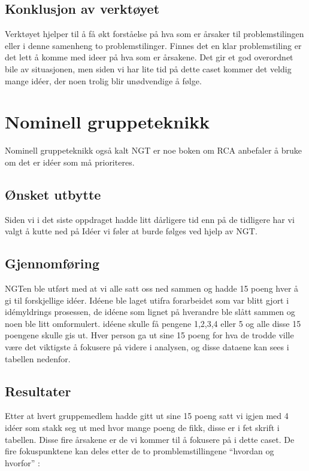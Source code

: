 \subsection{Konklusjon av verktøyet}
Verktøyet hjelper til å få økt forståelse på hva som er årsaker til problemstilingen eller i denne samenheng to problemstilinger. Finnes det en klar problemstiling er det lett å komme med ideer på hva som er årsakene. Det gir et god overordnet bile av situasjonen, men siden vi har lite tid på dette caset kommer det veldig mange idéer, der noen trolig blir unødvendige å følge.



\section{Nominell gruppeteknikk}
Nominell gruppeteknikk også kalt NGT er noe boken om RCA \cite{RCA} anbefaler å bruke om det er idéer som må prioriteres. 

\subsection{Ønsket utbytte}
Siden vi i det siste oppdraget hadde litt dårligere tid enn på de tidligere har vi valgt å kutte ned på Idéer vi føler at burde følges ved hjelp av NGT.
\subsection{Gjennomføring}
NGTen ble utført med at vi alle satt oss ned sammen og hadde 15 poeng hver å gi til forskjellige idéer. Idéene ble laget utifra forarbeidet som var blitt gjort i idémyldrings prosessen, de idéene som lignet på hverandre ble slått sammen og noen ble litt omformulert. idéene skulle få pengene 1,2,3,4 eller 5 og alle disse 15 poengene skulle gis ut. Hver person ga ut sine 15 poeng for hva de trodde ville være det viktigste å fokusere på videre i analysen, og disse dataene kan sees i tabellen nedenfor.

\subsection{Resultater}
Etter at hvert gruppemedlem hadde gitt ut sine 15 poeng satt vi igjen med 4 idéer som stakk seg ut med hvor mange poeng de fikk, disse er i fet skrift i tabellen. Disse fire årsakene er de vi kommer til å fokusere på i dette caset. De fire fokuspunktene kan deles etter de to promblemstillingene ``hvordan og hvorfor'' :

